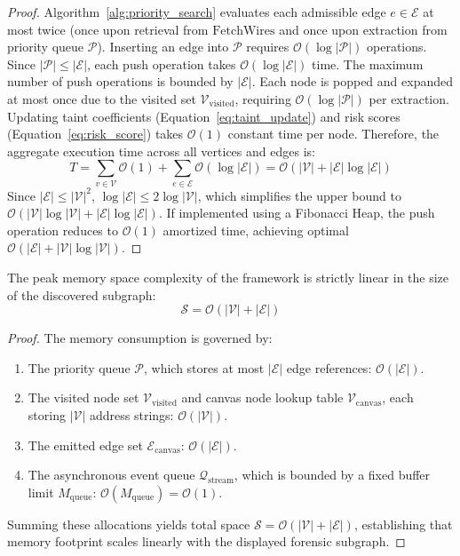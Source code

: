 \begin{proof}
Algorithm~\ref{alg:priority_search} evaluates each admissible edge $e \in \mathcal{E}$ at most twice (once upon retrieval from $\text{FetchWires}$ and once upon extraction from priority queue $\mathcal{P}$).
Inserting an edge into $\mathcal{P}$ requires $\mathcal{O}(\log |\mathcal{P}|)$ operations. Since $|\mathcal{P}| \le |\mathcal{E}|$, each push operation takes $\mathcal{O}(\log |\mathcal{E}|)$ time. The maximum number of push operations is bounded by $|\mathcal{E}|$.
Each node is popped and expanded at most once due to the visited set $\mathcal{V}_{\text{visited}}$, requiring $\mathcal{O}(\log |\mathcal{P}|)$ per extraction.
Updating taint coefficients (Equation~\ref{eq:taint_update}) and risk scores (Equation~\ref{eq:risk_score}) takes $\mathcal{O}(1)$ constant time per node.
Therefore, the aggregate execution time across all vertices and edges is:
\begin{equation}
    T = \sum_{v \in \mathcal{V}} \mathcal{O}(1) + \sum_{e \in \mathcal{E}} \mathcal{O}(\log |\mathcal{E}|) = \mathcal{O}(|\mathcal{V}| + |\mathcal{E}| \log |\mathcal{E}|)
\end{equation}
Since $|\mathcal{E}| \le |\mathcal{V}|^2$, $\log |\mathcal{E}| \le 2 \log |\mathcal{V}|$, which simplifies the upper bound to $\mathcal{O}(|\mathcal{V}| \log |\mathcal{V}| + |\mathcal{E}| \log |\mathcal{E}|)$.
If implemented using a Fibonacci Heap, the push operation reduces to $\mathcal{O}(1)$ amortized time, achieving optimal $\mathcal{O}(|\mathcal{E}| + |\mathcal{V}| \log |\mathcal{V}|)$.
\end{proof}

\begin{theorem}
\label{thm:space_complexity}
The peak memory space complexity of the framework is strictly linear in the size of the discovered subgraph:
\begin{equation}
    \mathcal{S} = \mathcal{O}(|\mathcal{V}| + |\mathcal{E}|)
\end{equation}
\end{theorem}

\begin{proof}
The memory consumption is governed by:
\begin{enumerate}
    \item The priority queue $\mathcal{P}$, which stores at most $|\mathcal{E}|$ edge references: $\mathcal{O}(|\mathcal{E}|)$.
    \item The visited node set $\mathcal{V}_{\text{visited}}$ and canvas node lookup table $\mathcal{V}_{\text{canvas}}$, each storing $|\mathcal{V}|$ address strings: $\mathcal{O}(|\mathcal{V}|)$.
    \item The emitted edge set $\mathcal{E}_{\text{canvas}}$: $\mathcal{O}(|\mathcal{E}|)$.
    \item The asynchronous event queue $\mathcal{Q}_{\text{stream}}$, which is bounded by a fixed buffer limit $M_{\text{queue}}$: $\mathcal{O}(M_{\text{queue}}) = \mathcal{O}(1)$.
\end{enumerate}
Summing these allocations yields total space $\mathcal{S} = \mathcal{O}(|\mathcal{V}| + |\mathcal{E}|)$, establishing that memory footprint scales linearly with the displayed forensic subgraph.
\end{proof}
